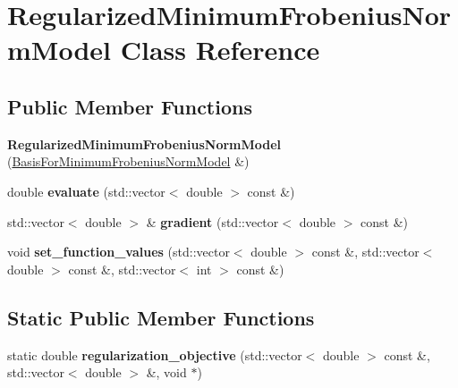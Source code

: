 \hypertarget{class_regularized_minimum_frobenius_norm_model}{}\section{Regularized\+Minimum\+Frobenius\+Norm\+Model Class Reference}
\label{class_regularized_minimum_frobenius_norm_model}
\subsection*{Public Member Functions}
\begin{DoxyCompactItemize}
\item 
{\bfseries Regularized\+Minimum\+Frobenius\+Norm\+Model} (\hyperlink{class_basis_for_minimum_frobenius_norm_model}{Basis\+For\+Minimum\+Frobenius\+Norm\+Model} \&)\hypertarget{class_regularized_minimum_frobenius_norm_model_a0149abd32e4bfec6f278ed36d88e87c0}{}\label{class_regularized_minimum_frobenius_norm_model_a0149abd32e4bfec6f278ed36d88e87c0}

\item 
double {\bfseries evaluate} (std\+::vector$<$ double $>$ const \&)\hypertarget{class_regularized_minimum_frobenius_norm_model_a1f69ae8716f15fda09bb6ca2b8375be9}{}\label{class_regularized_minimum_frobenius_norm_model_a1f69ae8716f15fda09bb6ca2b8375be9}

\item 
std\+::vector$<$ double $>$ \& {\bfseries gradient} (std\+::vector$<$ double $>$ const \&)\hypertarget{class_regularized_minimum_frobenius_norm_model_a39f8d4d9fa8e767157fc94e93813111a}{}\label{class_regularized_minimum_frobenius_norm_model_a39f8d4d9fa8e767157fc94e93813111a}

\item 
void {\bfseries set\+\_\+function\+\_\+values} (std\+::vector$<$ double $>$ const \&, std\+::vector$<$ double $>$ const \&, std\+::vector$<$ int $>$ const \&)\hypertarget{class_regularized_minimum_frobenius_norm_model_aef49d7f3f49bd838ec049af1be3372bf}{}\label{class_regularized_minimum_frobenius_norm_model_aef49d7f3f49bd838ec049af1be3372bf}

\end{DoxyCompactItemize}
\subsection*{Static Public Member Functions}
\begin{DoxyCompactItemize}
\item 
static double {\bfseries regularization\+\_\+objective} (std\+::vector$<$ double $>$ const \&, std\+::vector$<$ double $>$ \&, void $\ast$)\hypertarget{class_regularized_minimum_frobenius_norm_model_a2897b6c2145529261d7cd59dd077192e}{}\label{class_regularized_minimum_frobenius_norm_model_a2897b6c2145529261d7cd59dd077192e}

\end{DoxyCompactItemize}
